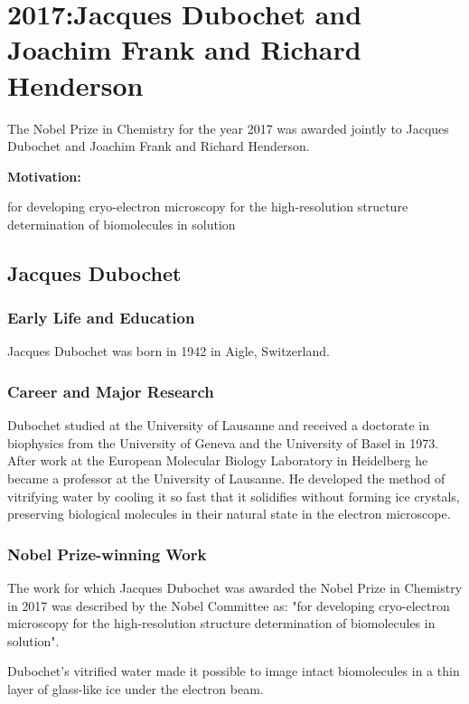 \chapter{2017:Jacques Dubochet and Joachim Frank and Richard Henderson}

\label{chap:chemistry2017}

The Nobel Prize in Chemistry for the year 2017 was awarded jointly to Jacques Dubochet and Joachim Frank and Richard Henderson.

\textbf{Motivation:}

for developing cryo-electron microscopy for the high-resolution structure determination of biomolecules in solution

\section{Jacques Dubochet}

\subsection*{Early Life and Education}

Jacques Dubochet was born in 1942 in Aigle, Switzerland.

\subsection*{Career and Major Research}

Dubochet studied at the University of Lausanne and received a doctorate in biophysics from the University of Geneva and the University of Basel in 1973. After work at the European Molecular Biology Laboratory in Heidelberg he became a professor at the University of Lausanne. He developed the method of vitrifying water by cooling it so fast that it solidifies without forming ice crystals, preserving biological molecules in their natural state in the electron microscope.

\subsection*{Nobel Prize-winning Work}

The work for which Jacques Dubochet was awarded the Nobel Prize in Chemistry in 2017 was described by the Nobel Committee as: "for developing cryo-electron microscopy for the high-resolution structure determination of biomolecules in solution".

Dubochet's vitrified water made it possible to image intact biomolecules in a thin layer of glass-like ice under the electron beam.

